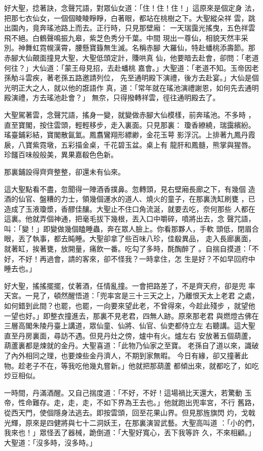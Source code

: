 \begin{pinyinscope}
{好大聖，捻著訣，念聲咒語，對眾仙女道：「住！住！住！」這原來是個定身
法，把那七衣仙女，一個個睖睖睜睜，白著眼，都站在桃樹之下。大聖縱朵祥
雲，跳出園內，竟奔瑤池路上而去。正行時，只見那壁廂：
一天瑞靄光搖曳，五色祥雲飛不絕。白鶴聲鳴振九皋，紫芝色秀分千葉。中間
現出一尊仙，相貌天然丰采別。神舞虹霓幌漢霄，腰懸寶籙無生滅。名稱赤腳
大羅仙，特赴蟠桃添壽節。那赤腳大仙覿面撞見大聖，大聖低頭定計，賺哄真
仙，他要暗去赴會，卻問：「老道何往？」大仙道：「蒙王母見招，去赴蟠桃
嘉會。」大聖道：「老道不知。玉帝因老孫觔斗雲疾，著老孫五路邀請列位，
先至通明殿下演禮，後方去赴宴。」大仙是個光明正大之人，就以他的誑語作
真，道：「常年就在瑤池演禮謝恩，如何先去通明殿演禮，方去瑤池赴會？」
無奈，只得撥轉祥雲，徑往通明殿去了。

大聖駕著雲，念聲咒語，搖身一變，就變做赤腳大仙模樣，前奔瑤池。不多時
，直至寶閣，按住雲頭，輕輕移步，走入裏面。只見那裏：
瓊香繚繞，瑞靄繽紛。瑤臺鋪彩結，寶閣散氤氳。鳳翥鸞翔形縹緲，金花玉萼
影浮沉。上排著九鳳丹霞扆，八寶紫霓墩，五彩描金桌，千花碧玉盆。桌上有
龍肝和鳳髓，熊掌與猩唇。珍饈百味般般美，異果嘉殽色色新。

那裏鋪設得齊齊整整，卻還未有仙來。

這大聖點看不盡，忽聞得一陣酒香撲鼻。忽轉頭，見右壁廂長廊之下，有幾個
造酒的仙官、盤糟的力士，領幾個運水的道人、燒火的童子，在那裏洗缸刷甕
，已造成了玉液瓊漿，香醪佳釀。大聖止不住口角流涎，就要去吃，奈何那些
人都在這裏。他就弄個神通，把毫毛拔下幾根，丟入口中嚼碎，噴將出去，念
聲咒語，叫：「變！」即變做幾個瞌睡蟲，奔在眾人臉上。你看那夥人，手軟
頭低，閉眉合眼，丟了執事，都去盹睡。大聖卻拿了些百味八珍，佳殽異品，
走入長廊裏面，就著缸，挨著甕，放開量，痛飲一番。吃勾了多時，酕醄醉了
。自揣自摸道：「不好，不好！再過會，請的客來，卻不怪我？一時拿住，怎
生是好？不如早回府中睡去也。」

好大聖，搖搖擺擺，仗著酒，任情亂撞。一會把路差了，不是齊天府，卻是兜
率天宮。一見了，頓然醒悟道：「兜率宮是三十三天之上，乃離恨天太上老君
之處，如何錯到此間？也罷，也罷，一向要來望此老，不曾得來，今趁此殘步
，就望他一望也好。」即整衣撞進去，那裏不見老君，四無人跡。原來那老君
與燃燈古佛在三層高閣朱陵丹臺上講道，眾仙童、仙將、仙官、仙吏都侍立左
右聽講。這大聖直至丹房裏面，尋訪不遇。但見丹灶之傍，爐中有火。爐左右
安放著五個葫蘆，葫蘆裏都是煉就的金丹。大聖喜道：「此物乃仙家之至寶。
老孫自了道以來，識破了內外相同之理，也要煉些金丹濟人，不期到家無暇。
今日有緣，卻又撞著此物。趁老子不在，等我吃他幾丸嘗新。」他就把那葫蘆
都傾出來，就都吃了，如吃炒豆相似。

一時間，丹滿酒醒。又自己揣度道：「不好，不好！這場禍比天還大，若驚動
玉帝，性命難存。走，走，走，不如下界為王去也。」他就跑出兜率宮，不行
舊路，從西天門，使個隱身法逃去。即按雲頭，回至花果山界。但見那旌旗閃
灼，戈戟光輝，原來是四健將與七十二洞妖王，在那裏演習武藝。大聖高叫道
：「小的們，我來也！」眾怪丟了器械，跪倒道：「大聖好寬心，丟下我等許
久，不來相顧。」大聖道：「沒多時，沒多時。」

}
\end{pinyinscope}
